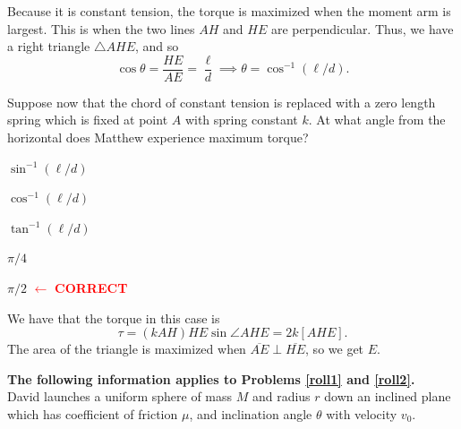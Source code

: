 \documentclass[11pt]{scrartcl}
\newcommand{\cor}{\textcolor{red}{$\leftarrow$ \textbf{CORRECT}}}
\begin{document}
\begin{sol}
    Because it is constant tension, the torque is maximized when the moment arm is largest. This is when the two lines $AH$ and $HE$ are perpendicular. Thus, we have a right triangle $\triangle AHE$, and so
    $$\cos \theta = \frac{HE}{AE} = \frac{\ell}{d} \implies \theta = \cos^{-1} (\ell/d).$$
\end{sol}


\begin{prob}\label{pull2}
    Suppose now that the chord of constant tension is replaced with a zero length spring which is fixed at point $A$ with spring constant $k$. At what angle from the horizontal does Matthew experience maximum torque?
    \begin{choices}
        \item $\sin^{-1}(\ell/d)$
        \item $\cos^{-1}(\ell/d)$
        \item $\tan^{-1}(\ell/d)$
        \item $\pi/4$
        \item $\pi/2$ \cor
    \end{choices}
\end{prob}
\begin{sol}
    We have that the torque in this case is
    $$\tau = (kAH) HE \sin \angle AHE = 2k [AHE].$$
    The area of the triangle is maximized when $\overline {AE} \perp \overline {HE}$, so we get $E$.
\end{sol}

\textbf{The following information applies to Problems \ref{roll1} and \ref{roll2}.}\\
David launches a uniform sphere of mass $M$ and radius $r$ down an inclined plane which has coefficient of friction $\mu$, and inclination angle $\theta$ with velocity $v_0$.
\end{document}
